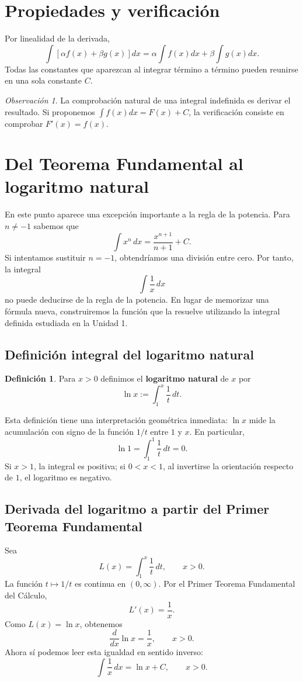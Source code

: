 \documentclass[12pt]{article}
\theoremstyle{definition}
\newtheorem{definicion}[teorema]{Definición}
\theoremstyle{remark}
\newtheorem*{observacion}{Observación}
\begin{document}
\section*{Propiedades y verificación}
Por linealidad de la derivada,
\[\int[\alpha f(x)+\beta g(x)]dx=\alpha\int f(x)dx+\beta\int g(x)dx.\]
Todas las constantes que aparezcan al integrar término a término pueden reunirse en una sola constante $C$.
\begin{observacion}La comprobación natural de una integral indefinida es derivar el resultado. Si proponemos $\int f(x)dx=F(x)+C$, la verificación consiste en comprobar $F'(x)=f(x)$.\end{observacion}
\section{Del Teorema Fundamental al logaritmo natural}
En este punto aparece una excepción importante a la regla de la potencia. Para $n\neq-1$ sabemos que
\[
\int x^n\,dx=\frac{x^{n+1}}{n+1}+C.
\]
Si intentamos sustituir $n=-1$, obtendríamos una división entre cero. Por tanto, la integral
\[
\int\frac{1}{x}\,dx
\]
no puede deducirse de la regla de la potencia. En lugar de memorizar una fórmula nueva, construiremos la función que la resuelve utilizando la integral definida estudiada en la Unidad 1.

\subsection*{Definición integral del logaritmo natural}
\begin{definicion}
Para $x>0$ definimos el \textbf{logaritmo natural} de $x$ por
\[
\boxed{\ln x:=\int_1^x\frac{1}{t}\,dt.}
\]
\end{definicion}
Esta definición tiene una interpretación geométrica inmediata: $\ln x$ mide la acumulación con signo de la función $1/t$ entre $1$ y $x$. En particular,
\[
\ln1=\int_1^1\frac{1}{t}\,dt=0.
\]
Si $x>1$, la integral es positiva; si $0<x<1$, al invertirse la orientación respecto de $1$, el logaritmo es negativo.

\subsection*{Derivada del logaritmo a partir del Primer Teorema Fundamental}
Sea
\[
L(x)=\int_1^x\frac{1}{t}\,dt,\qquad x>0.
\]
La función $t\mapsto1/t$ es continua en $(0,\infty)$. Por el Primer Teorema Fundamental del Cálculo,
\[
L'(x)=\frac1x.
\]
Como $L(x)=\ln x$, obtenemos
\[
\boxed{\frac{d}{dx}\ln x=\frac1x,\qquad x>0.}
\]
Ahora sí podemos leer esta igualdad en sentido inverso:
\[
\boxed{\int\frac1x\,dx=\ln x+C,\qquad x>0.}
\]
\end{document}
